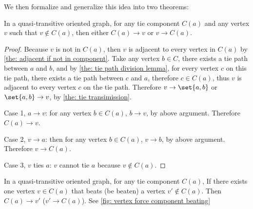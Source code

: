 We then formalize and generalize this idea into two theorems:

\begin{lemma}\label{the: component and a single point}
  In a quasi-transitive oriented graph,
  for any tie component \(C(a)\) and
  any vertex \(v\) such that \(v \notin C(a)\),
  then either \(C(a) \to v\) or \(v \to C(a)\).
\end{lemma}

\begin{proof}
  Because \(v\) is not in \(C(a)\),
  then \(v\) is adjacent to every vertex in \(C(a)\)
  by \cref{the: adjacent if not in component}.
  Take any vertex \(b \in C\),
  there exists a tie path between \(a\) and \(b\),
  and by \cref{the: tie path division lemma},
  for every vertex \(c\) on this tie path,
  there exists a tie path between \(c\) and \(a\),
  therefore \(c \in C(a)\),
  thus \(v\) is adjacent to every vertex \(c\) on the tie path.
  Therefore \(v \to \set{a, b}\) or \(\set{a, b} \to v\),
  by \cref{the: tie transimission}.

  Case 1, \(a \to v\): for any vertex \(b \in C(a)\),
  \(b \to v\), by above argument.
  Therefore \(C(a) \to v\).

  Case 2, \(v \to a\): then for any vertex \(b \in C(a)\),
  \(v \to b\), by above argument.
  Therefore \(v \to C(a)\).

  Case 3, \(v\) ties \(a\):
  \(v\) cannot tie \(a\) because \(v \notin C(a)\).
\end{proof}

\begin{lemma}\label{the: vertex force component beating}
  In a quasi-transitive oriented graph,
  for any tie component \(C(a)\),
  If there exists one vertex \(v \in C(a)\)
  that beats (be beaten) a vertex \(v' \notin C(a)\).
  Then \(C(a) \to v'\) (\(v' \to C(a)\)).
  See \cref{fig: vertex force component beating}
\end{lemma}

